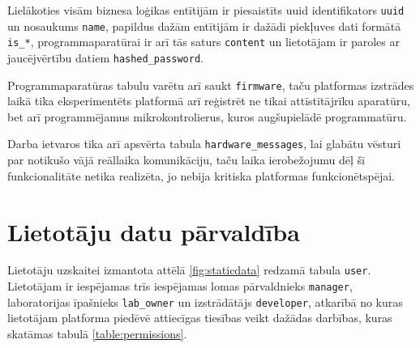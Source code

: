 Lielākoties visām biznesa loģikas entītijām ir piesaistīts \gls{uuid}
identifikators \lstinline!uuid! un nosaukums \lstinline!name!, papildus dažām
entītijām ir dažādi piekļuves dati formātā \lstinline!is_*!, programmaparatūrai
ir arī tās saturs \lstinline!content! un lietotājam ir paroles ar jaucējvērtību
datiem \lstinline!hashed_password!.

Programmaparatūras tabulu varētu arī saukt \lstinline!firmware!, taču platformas
izstrādes laikā tika eksperimentēts platformā arī reģistrēt ne tikai
attīstītājrīku aparatūru, bet arī programmējamus mikrokontrolierus, kuros
augšupielādē programmatūru.

Darba ietvaros tika arī apsvērta tabula \lstinline!hardware_messages!, lai
glabātu vēsturi par notikušo vājā reāllaika komunikāciju, taču laika
ierobežojumu dēļ šī funkcionalitāte netika realizēta, jo nebija kritiska
platformas funkcionētspējai.

\section{Lietotāju datu pārvaldība}
\label{sec:usermgmt}

Lietotāju uzskaitei izmantota attēlā \ref{fig:staticdata} redzamā tabula
\lstinline!user!. Lietotājam ir iespējamas trīs iespējamas lomas pārvaldnieks
\lstinline!manager!, laboratorijas īpašnieks \lstinline!lab_owner! un
izstrādātājs \lstinline!developer!, atkarībā no kuras lietotājam platforma
piedēvē attiecīgas tiesības veikt dažādas darbības, kuras skatāmas tabulā
\ref{table:permissions}.

